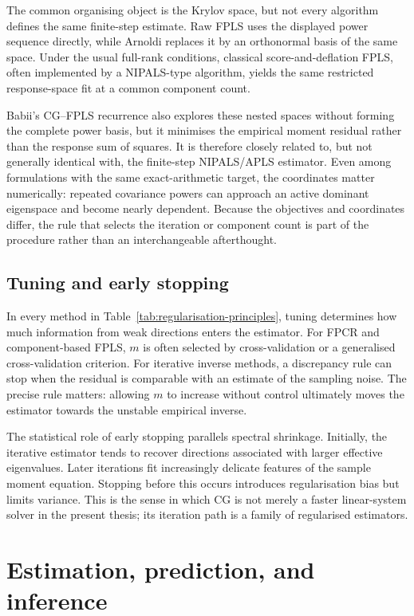 The common organising object is the Krylov space, but not every algorithm
defines the same finite-step estimate.  Raw FPLS uses the displayed power
sequence directly, while Arnoldi replaces it by an orthonormal basis of the same
space.  Under the usual full-rank conditions, classical score-and-deflation
FPLS, often implemented by a NIPALS-type algorithm, yields the same restricted
response-space fit at a common component count.

Babii's CG--FPLS recurrence also explores these nested spaces
without forming the complete power basis, but it minimises the empirical moment
residual rather than the response sum of squares.  It is therefore closely
related to, but not generally identical with, the finite-step NIPALS/APLS
estimator.  Even among formulations with the same exact-arithmetic target, the
coordinates matter numerically: repeated covariance powers can approach an
active dominant eigenspace and become nearly dependent.  Because the objectives
and coordinates differ, the rule that selects the iteration or component count
is part of the procedure rather than an interchangeable afterthought.

\subsection{Tuning and early stopping}

In every method in Table~\ref{tab:regularisation-principles}, tuning determines how much information from weak directions enters the estimator. For FPCR and component-based FPLS, $m$ is often selected by cross-validation or a generalised cross-validation criterion. For iterative inverse methods, a discrepancy rule can stop when the residual is comparable with an estimate of the sampling noise. The precise rule matters: allowing $m$ to increase without control ultimately moves the estimator towards the unstable empirical inverse.

The statistical role of early stopping parallels spectral shrinkage. Initially, the iterative estimator tends to recover directions associated with larger effective eigenvalues. Later iterations fit increasingly delicate features of the sample moment equation. Stopping before this occurs introduces regularisation bias but limits variance. This is the sense in which CG is not merely a faster linear-system solver in the present thesis; its iteration path is a family of regularised estimators.

\section{Estimation, prediction, and inference}
\label{sec:background-estimation-inference}

